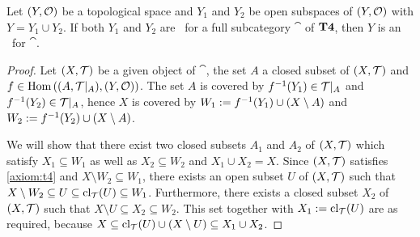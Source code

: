 \begin{proposition}
	Let $\tspace[Y][O]$ be a topological space and $Y_1$ and $Y_2$ be open subspaces of $\tspace[Y][O]$ with $Y = Y_1 \cup Y_2$. If both $Y_1$ and $Y_2$ are \anes\ for a full subcategory $\cat$ of $\mathbf{T4}$, then $Y$ is an \ane\ for $\cat$. 
\end{proposition}
\begin{proof}
	Let $\tspace$ be a given object of $\cat$, the set $A$ a closed subset of $\tspace$ and $f \in \Hom\pbraces{\reltspace, \tspace[Y][O]}$. The set $A$ is covered by $f^{-1}{\left ( Y_1 \right )} \in \mathcal{T}\vert_A$ and $f^{-1}{\left ( Y_2 \right )} \in \mathcal{T}\vert_A$, hence $X$ is covered by $W_1 := f^{-1}{\left ( Y_1 \right )} \cup {\left ( X \setminus A \right )}$ and $W_2 := f^{-1}{\left ( Y_2 \right )} \cup {\left ( X \setminus A \right )}$.
	
	
	We will show that there exist two closed subsets $A_1$ and $A_2$ of $\tspace$ which satisfy $X_1 \subseteq W_1$ as well as $X_2 \subseteq W_2$ and $X_1 \cup X_2 = X$. Since $\tspace$ satisfies \ref{axiom:t4} and $X \setminus W_2 \subseteq W_1$, there exists an open subset $U$ of $\tspace$ such that $X \setminus W_2 \subseteq U \subseteq \mathrm{cl}_\mathcal{T}{\left ( U \right )} \subseteq W_1$. Furthermore, there exists a closed subset $X_2$ of $\tspace$ such that $X \setminus U \subseteq X_2 \subseteq W_2$. This set together with $X_1 := \mathrm{cl}_\mathcal{T}{\left ( U \right )}$ are as required, because $X \subseteq \mathrm{cl}_\mathcal{T}{\left ( U \right )} \cup {\left ( X \setminus U \right )} \subseteq X_1 \cup X_2$. 
	
\end{proof}

